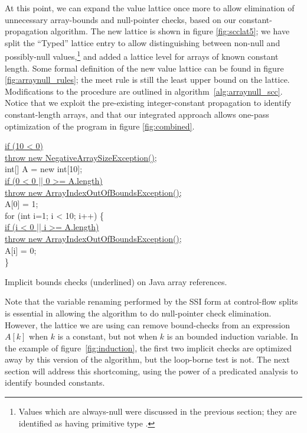 \documentclass[12pt,titlepage,twoside]{article}
\begin{document}
At this point, we can expand the value lattice once more to allow
elimination of unnecessary array-bounds and null-pointer checks, based
on our constant-propagation algorithm.  The new lattice is shown in
figure \ref{fig:scclat5}; we have split the ``Typed'' lattice entry to
allow distinguishing between non-null and possibly-null
values,\footnote{Values which are always-null were discussed in the
previous section; they are identified as having primitive type .}
and added a lattice level for arrays of known constant length.  
Some formal definition of the new value lattice can be found in
figure \ref{fig:arraynull_rules}; the meet rule is still the least upper
bound on the lattice.  Modifications to the  procedure are
outlined in algorithm~\ref{alg:arraynull_scc}.
Notice that we exploit the pre-existing integer-constant propagation to
identify constant-length arrays, and that our integrated approach
allows one-pass optimization of the program in figure \ref{fig:combined}.

\begin{myfigure}\newcommand{\implicitcheck}[1]{\underline{#1}}
\begin{samplecode}
\implicitcheck{if (10 < 0)}\\
\>\implicitcheck{throw new NegativeArraySizeException();}\\
int[] A = new int[10]; \\
\implicitcheck{if (0 < 0 || 0 >= A.length)}\\
\>\implicitcheck{throw new ArrayIndexOutOfBoundsException();}\\
A[0] = 1;\\
for (int i=1; i < 10; i++) \{\\
\>\implicitcheck{if (i < 0 || i >= A.length)}\\
\>\>\implicitcheck{throw new ArrayIndexOutOfBoundsException();}\\
\>A[i] = 0;\\
\}\\
\end{samplecode}
\caption[Implicit bounds checks on Java array references.]
{Implicit bounds checks (underlined) on Java array references.}
\label{fig:induction}
\end{myfigure}
Note that the variable renaming performed by the SSI form at
control-flow splits is essential in allowing the algorithm to do 
null-pointer check elimination.  However, the lattice we are using
can remove bound-checks from an expression $A[k]$ when $k$ is a
constant, but not when $k$ is an bounded induction variable.
In the example of figure~\vref{fig:induction}, the first two implicit
checks are optimized away by this version of the algorithm, but the
loop-borne test is not.  The next section will address this
shortcoming, using the power of a predicated analysis to identify
bounded constants.
\end{document}
